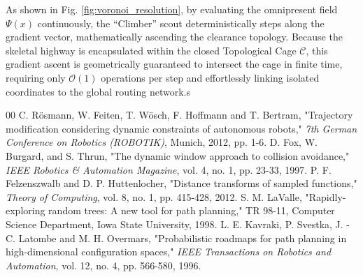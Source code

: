 \documentclass[letterpaper, 10 pt, conference]{IEEEtran}
\begin{document}
As shown in Fig. \ref{fig:voronoi_resolution}, by evaluating the omnipresent field $\Psi(x)$ continuously, the ``Climber'' scout deterministically steps along the gradient vector, mathematically ascending the clearance topology. Because the skeletal highway is encapsulated within the closed Topological Cage $\mathcal{C}$, this gradient ascent is geometrically guaranteed to intersect the cage in finite time, requiring only $\mathcal{O}(1)$ operations per step and effortlessly linking isolated coordinates to the global routing network.s
\begin{thebibliography}{00}
 C. Rösmann, W. Feiten, T. Wösch, F. Hoffmann and T. Bertram, "Trajectory modification considering dynamic constraints of autonomous robots," \textit{7th German Conference on Robotics (ROBOTIK)}, Munich, 2012, pp. 1-6.
 D. Fox, W. Burgard, and S. Thrun, "The dynamic window approach to collision avoidance," \textit{IEEE Robotics \& Automation Magazine}, vol. 4, no. 1, pp. 23-33, 1997.
 P. F. Felzenszwalb and D. P. Huttenlocher, "Distance transforms of sampled functions," \textit{Theory of Computing}, vol. 8, no. 1, pp. 415-428, 2012.
 S. M. LaValle, "Rapidly-exploring random trees: A new tool for path planning," TR 98-11, Computer Science Department, Iowa State University, 1998.
 L. E. Kavraki, P. Svestka, J. -C. Latombe and M. H. Overmars, "Probabilistic roadmaps for path planning in high-dimensional configuration spaces," \textit{IEEE Transactions on Robotics and Automation}, vol. 12, no. 4, pp. 566-580, 1996.
\end{thebibliography}
\end{document}
